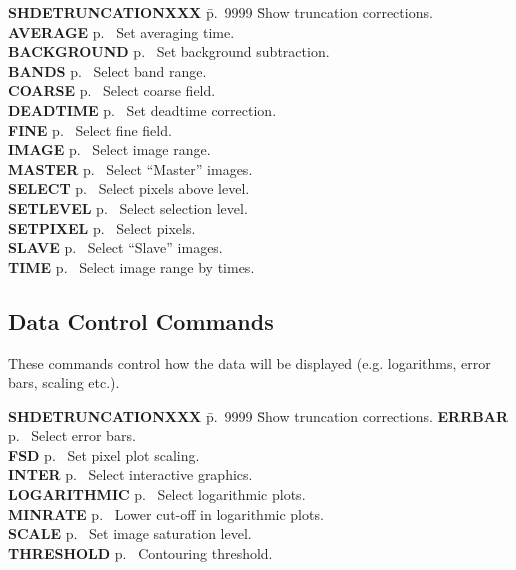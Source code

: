 \begin{tabbing}
{\bf SHDETRUNCATIONXXX} \= p.~9999 \= Show truncation corrections.\kill
{\bf AVERAGE} \> p.~\pageref{av} \> Set averaging time.\\
{\bf BACKGROUND} \> p.~\pageref{bac} \> Set background subtraction.\\
{\bf BANDS} \> p.~\pageref{ban} \> Select band range.\\
{\bf COARSE} \> p.~\pageref{coa} \> Select coarse field.\\
{\bf DEADTIME} \> p.~\pageref{dea} \> Set deadtime correction.\\
{\bf FINE} \> p.~\pageref{fin} \> Select fine field.\\
{\bf IMAGE} \> p.~\pageref{im} \> Select image range.\\
{\bf MASTER} \> p.~\pageref{mas} \> Select ``Master'' images.\\
{\bf SELECT} \> p.~\pageref{sel} \> Select pixels above level.\\
{\bf SETLEVEL} \> p.~\pageref{setl} \> Select selection level.\\
{\bf SETPIXEL} \> p.~\pageref{setp} \> Select pixels.\\
{\bf SLAVE} \> p.~\pageref{sl} \> Select ``Slave'' images.\\
{\bf TIME} \> p.~\pageref{ti} \> Select image range by times.\\
\end{tabbing}

\subsection{Data Control Commands}

These commands control how the data will be displayed (e.g. logarithms,
error bars, scaling etc.).

\begin{tabbing}
{\bf SHDETRUNCATIONXXX} \= p.~9999 \= Show truncation corrections.\kill
{\bf ERRBAR} \> p.~\pageref{er} \> Select error bars.\\
{\bf FSD} \> p.~\pageref{fsd} \> Set pixel plot scaling.\\
{\bf INTER} \> p.~\pageref{int} \> Select interactive graphics.\\
{\bf LOGARITHMIC} \> p.~\pageref{lo} \> Select logarithmic plots.\\
{\bf MINRATE} \> p.~\pageref{mi} \> Lower cut-off in logarithmic
plots.\\
{\bf SCALE} \> p.~\pageref{sc} \> Set image saturation level.\\
{\bf THRESHOLD} \> p.~\pageref{th} \> Contouring threshold.\\
\end{tabbing}

